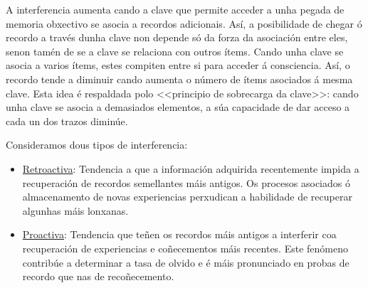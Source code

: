 \documentclass[a4paper,11pt]{article}
\begin{document}
\begin{itemize}
	A interferencia aumenta cando a clave que permite acceder a unha pegada de memoria obxectivo se 
	asocia a recordos adicionais. Así, a posibilidade de chegar ó recordo a través dunha clave non 
	depende só da forza da asociación entre eles, senon tamén de se a clave se relaciona con outros 
	ítems. Cando unha clave se asocia a varios ítems, estes compiten entre si para acceder á 
	consciencia. Así, o recordo tende a diminuir cando aumenta o número de ítems asociados á mesma 
	clave. Esta idea é respaldada polo <<principio de sobrecarga da clave>>: cando unha clave se 
	asocia a demasiados elementos, a súa capacidade de dar acceso a cada un dos trazos diminúe.
	
	Consideramos dous tipos de interferencia:
	\begin{itemize}
		\item \underline{Retroactiva}: Tendencia a que a información adquirida recentemente impida a 
		recuperación de recordos semellantes máis antigos. Os procesos asociados ó almacenamento de 
		novas experiencias perxudican a habilidade de recuperar algunhas máis lonxanas.
		\item \underline{Proactiva}: Tendencia que teñen os recordos máis antigos a interferir coa 
		recuperación de experiencias e coñecementos máis recentes. Este fenómeno contribúe a 
		determinar a tasa de olvido e é máis pronunciado en probas de recordo que nas de 
		recoñecemento.
	\end{itemize}
	

\end{itemize}
\end{document}
